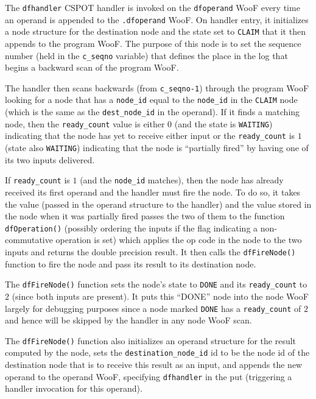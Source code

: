 \documentclass[10pt]{article}
\begin{document}
The \verb+dfhandler+ CSPOT handler is invoked on the \verb+dfoperand+ WooF
every time an operand is appended to the \verb+.dfoperand+ WooF.  On handler
entry, it initializes a node structure for the destination node and the state
set to \verb+CLAIM+ that it then appends to the program WooF.  The purpose of
this node is to set the sequence number (held in the \verb+c_seqno+ 
variable) that defines the place in the log that begins a backward scan
of the program WooF.

The handler then scans backwards (from \verb+c_seqno-1+) through the program
WooF looking for a node that has a \verb+node_id+ equal to the \verb+node_id+
in the \verb+CLAIM+ node (which is the same as the \verb+dest_node_id+ in the
operand).  If it finds a matching node, then the \verb+ready_count+ value is
either $0$ (and the state is \verb+WAITING+) indicating that the node has yet
to receive either input or the \verb+ready_count+ is $1$ (state also
\verb+WAITING+) indicating that the
node is ``partially fired'' by having one of its two inputs delivered.

If \verb+ready_count+ is $1$ (and the \verb+node_id+ matches), then 
the node has already received its first operand and the handler must fire the
node.  To do so, it takes the value (passed in the operand structure to the
handler) and the value stored in the node when it was partially fired passes
the two of them to the function \verb+dfOperation()+ 
(possibly ordering the inputs
if the flag indicating a non-commutative operation is set) 
which applies the op code in
the node to the two inputs and returns the double precision result.  It then
calls the \verb+dfFireNode()+ function to fire the node and pass its result to its
destination node.

The \verb+dfFireNode()+ function sets the node's state to \verb+DONE+ and its
\verb+ready_count+ to $2$ (since both inputs are present).  It puts this
``DONE'' node into the node WooF largely for debugging purposes since a node
marked \verb+DONE+ has a \verb+ready_count+ of $2$ and hence will be skipped
by the handler in any node WooF scan.

The \verb+dfFireNode()+ function also initializes an operand structure for the
result computed by the node, sets the \verb+destination_node_id+ id to be the node id of
the destination node that is to receive this result as an input, and appends
the new operand to the operand WooF, specifying \verb+dfhandler+ in the put
(triggering a handler invocation for this operand).
\end{document}
